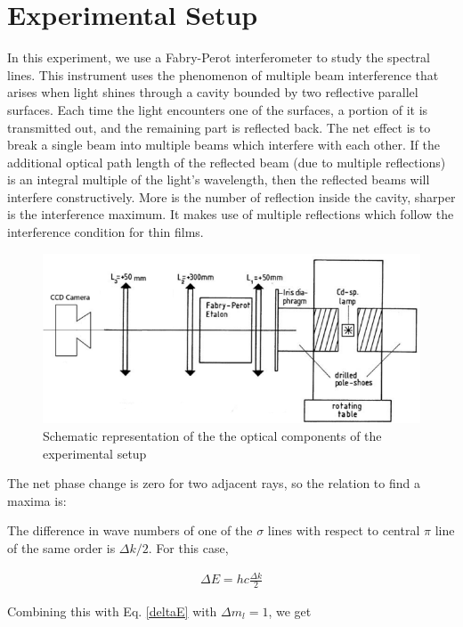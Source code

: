 \section{Experimental Setup}

In this experiment, we use a Fabry-Perot interferometer to study the spectral lines. This instrument uses the phenomenon
of multiple beam interference that arises when light shines
through a cavity bounded by two reflective parallel surfaces. Each time the light encounters one of the surfaces,
a portion of it is transmitted out, and the remaining part
is reflected back. The net effect is to break a single beam into multiple beams which interfere with each other. If
the additional optical path length of the reflected beam
(due to multiple reflections) is an integral multiple of the
light's wavelength, then the reflected beams will interfere
constructively. More is the number of reflection inside the
cavity, sharper is the interference maximum. It makes use of multiple reflections which follow the interference condition for thin films. 

\begin{figure}
    \centering
    \includegraphics[width=1\columnwidth]{images/exp1.png}
    \caption{Schematic representation of the the optical components of the experimental setup}
\end{figure}

The net phase change is
zero for two adjacent rays, so the relation to find a maxima
is:

The difference in wave numbers of one of the $\sigma$ lines with respect to central $\pi$ line of the
same order is $\Delta k/2$. For this case,

\begin{align}
    \Delta E = hc\frac{\Delta k}{2}
\end{align}

Combining this with Eq. \ref{deltaE} with $\Delta m_l=1$, we get

